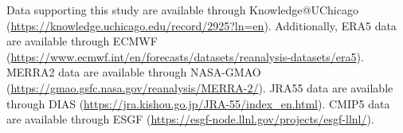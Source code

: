 \documentclass{ametsocV5}
\begin{document}
% 
%
\datastatement
Data supporting this study are available through Knowledge@UChicago (\url{https://knowledge.uchicago.edu/record/2925?ln=en}). Additionally, ERA5 data are available through ECMWF (\url{https://www.ecmwf.int/en/forecasts/datasets/reanalysis-datasets/era5}). MERRA2 data are available through NASA-GMAO (\url{https://gmao.gsfc.nasa.gov/reanalysis/MERRA-2/}). JRA55 data are available through DIAS (\url{https://jra.kishou.go.jp/JRA-55/index_en.html}). CMIP5 data are available through ESGF (\url{https://esgf-node.llnl.gov/projects/esgf-llnl/}). 

%






%
%
\end{document}
